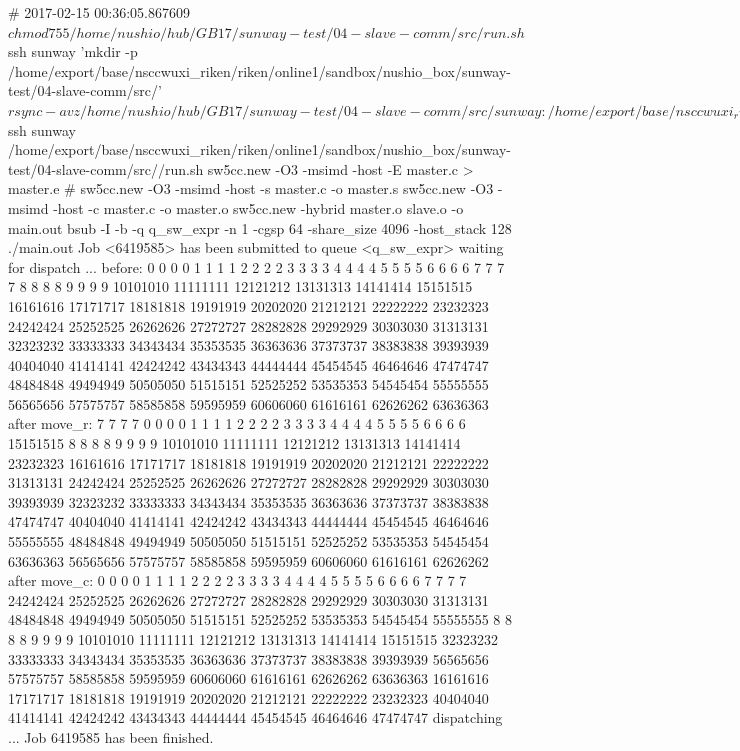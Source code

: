 \begin{code}
# 2017-02-15 00:36:05.867609
$ chmod 755 /home/nushio/hub/GB17/sunway-test/04-slave-comm/src/run.sh
$ ssh sunway 'mkdir -p /home/export/base/nsccwuxi_riken/riken/online1/sandbox/nushio_box/sunway-test/04-slave-comm/src/'
$ rsync -avz /home/nushio/hub/GB17/sunway-test/04-slave-comm/src/ sunway:/home/export/base/nsccwuxi_riken/riken/online1/sandbox/nushio_box/sunway-test/04-slave-comm/src/
sending incremental file list
./
master.c
run.sh

sent 532 bytes  received 78 bytes  135.56 bytes/sec
total size is 2,906  speedup is 4.76
$ ssh sunway /home/export/base/nsccwuxi_riken/riken/online1/sandbox/nushio_box/sunway-test/04-slave-comm/src//run.sh
sw5cc.new -O3 -msimd -host -E master.c > master.e
#	sw5cc.new -O3 -msimd -host -s master.c -o master.s
sw5cc.new -O3 -msimd -host -c master.c -o master.o
sw5cc.new -hybrid  master.o slave.o -o main.out
bsub -I -b -q q_sw_expr -n 1 -cgsp 64 -share_size 4096 -host_stack 128 ./main.out
Job <6419585> has been submitted to queue <q_sw_expr>
waiting for dispatch ...
before: 
 0 0 0 0  1 1 1 1  2 2 2 2  3 3 3 3  4 4 4 4  5 5 5 5  6 6 6 6  7 7 7 7 
 8 8 8 8  9 9 9 9 10101010 11111111 12121212 13131313 14141414 15151515 
16161616 17171717 18181818 19191919 20202020 21212121 22222222 23232323 
24242424 25252525 26262626 27272727 28282828 29292929 30303030 31313131 
32323232 33333333 34343434 35353535 36363636 37373737 38383838 39393939 
40404040 41414141 42424242 43434343 44444444 45454545 46464646 47474747 
48484848 49494949 50505050 51515151 52525252 53535353 54545454 55555555 
56565656 57575757 58585858 59595959 60606060 61616161 62626262 63636363
after move_r: 
 7 7 7 7  0 0 0 0  1 1 1 1  2 2 2 2  3 3 3 3  4 4 4 4  5 5 5 5  6 6 6 6 
15151515  8 8 8 8  9 9 9 9 10101010 11111111 12121212 13131313 14141414 
23232323 16161616 17171717 18181818 19191919 20202020 21212121 22222222 
31313131 24242424 25252525 26262626 27272727 28282828 29292929 30303030 
39393939 32323232 33333333 34343434 35353535 36363636 37373737 38383838 
47474747 40404040 41414141 42424242 43434343 44444444 45454545 46464646 
55555555 48484848 49494949 50505050 51515151 52525252 53535353 54545454 
63636363 56565656 57575757 58585858 59595959 60606060 61616161 62626262
after move_c: 
 0 0 0 0  1 1 1 1  2 2 2 2  3 3 3 3  4 4 4 4  5 5 5 5  6 6 6 6  7 7 7 7 
24242424 25252525 26262626 27272727 28282828 29292929 30303030 31313131 
48484848 49494949 50505050 51515151 52525252 53535353 54545454 55555555 
 8 8 8 8  9 9 9 9 10101010 11111111 12121212 13131313 14141414 15151515 
32323232 33333333 34343434 35353535 36363636 37373737 38383838 39393939 
56565656 57575757 58585858 59595959 60606060 61616161 62626262 63636363 
16161616 17171717 18181818 19191919 20202020 21212121 22222222 23232323 
40404040 41414141 42424242 43434343 44444444 45454545 46464646 47474747
dispatching ...
Job 6419585 has been finished.

\end{code}

